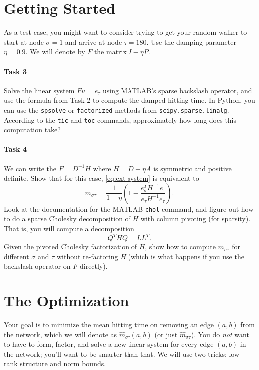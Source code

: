 \documentclass[12pt, leqno]{article}
\begin{document}
\section*{Getting Started}

As a test case, you might want to consider trying to get your random
walker to start at node $\sigma = 1$ and arrive at node $\tau = 180$.
Use the damping parameter $\eta = 0.9$.  We will denote by $F$ the
matrix $I-\eta P$.

\paragraph*{Task 3}
Solve the linear system $F u = e_\tau$ using MATLAB's sparse
backslash operator, and use the formula from Task 2 to compute the
damped hitting time.  In Python, you can use the {\tt spsolve} or
{\tt factorized} methods from {\tt scipy.sparse.linalg}.
According to the {\tt tic} and {\tt toc} commands,
approximately how long does this computation take?

\paragraph*{Task 4}
We can write the $F = D^{-1} H$ where $H = D-\eta A$ is symmetric and
positive definite.  Show that for this case,
\eqref{eq:ext-system} is equivalent to
\[
m_{\sigma \tau} =
\frac{1}{1-\eta}
\left(
  1 - \frac{e_{\sigma}^T H^{-1} e_{\tau}}{e_{\tau} H^{-1} e_{\tau}}
\right).
\]
Look at the documentation for the MATLAB
{\tt chol} command, and figure out how to do a sparse Cholesky decomposition of
$H$ with column pivoting (for sparsity).  That is, you will compute a
decomposition
\[
  Q^T H Q = LL^T.
\]
Given the pivoted Cholesky factorization of $H$, show how to compute
$m_{\sigma \tau}$ for different $\sigma$ and $\tau$ without
re-factoring $H$ (which is what happens if you use the backslash
operator on $F$ directly).

\section*{The Optimization}

Your goal is to minimize the mean hitting time on removing an edge
$(a,b)$ from the network, which we will denote as
$\hat{m}_{\sigma \tau}(a,b)$ (or just $\hat{m}_{\sigma \tau}$). You do
{\em not} want to have to form, factor, and solve a new linear system
for every edge $(a,b)$ in the network; you'll want to be smarter than
that.  We will use two tricks: low rank structure and norm bounds.
\end{document}
